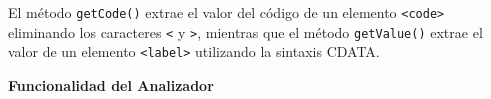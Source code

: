 El método \lstinline|getCode()| extrae el valor del código de un elemento \lstinline|<code>| eliminando los caracteres \lstinline|<| y \lstinline|>|, mientras que el método \lstinline|getValue()| extrae el valor de un elemento \lstinline|<label>| utilizando la sintaxis CDATA.

\phantom{text}

\noindent \textbf{Funcionalidad del Analizador}

\phantom{text}






